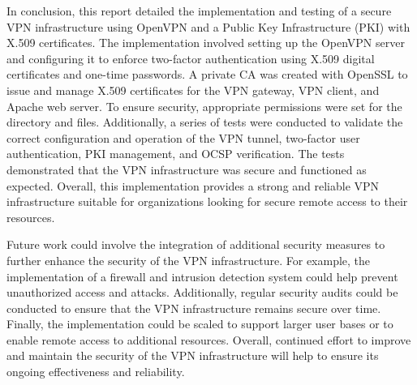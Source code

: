 \documentclass[12pt]{article}
\begin{document}
In conclusion, this report detailed the implementation and testing of a secure VPN infrastructure using OpenVPN and a Public Key Infrastructure (PKI) with X.509 certificates. The implementation involved setting up the OpenVPN server and configuring it to enforce two-factor authentication using X.509 digital certificates and one-time passwords. A private CA was created with OpenSSL to issue and manage X.509 certificates for the VPN gateway, VPN client, and Apache web server. To ensure security, appropriate permissions were set for the directory and files. Additionally, a series of tests were conducted to validate the correct configuration and operation of the VPN tunnel, two-factor user authentication, PKI management, and OCSP verification. The tests demonstrated that the VPN infrastructure was secure and functioned as expected. Overall, this implementation provides a strong and reliable VPN infrastructure suitable for organizations looking for secure remote access to their resources.

Future work could involve the integration of additional security measures to further enhance the security of the VPN infrastructure. For example, the implementation of a firewall and intrusion detection system could help prevent unauthorized access and attacks. Additionally, regular security audits could be conducted to ensure that the VPN infrastructure remains secure over time. Finally, the implementation could be scaled to support larger user bases or to enable remote access to additional resources. Overall, continued effort to improve and maintain the security of the VPN infrastructure will help to ensure its ongoing effectiveness and reliability.
\end{document}
